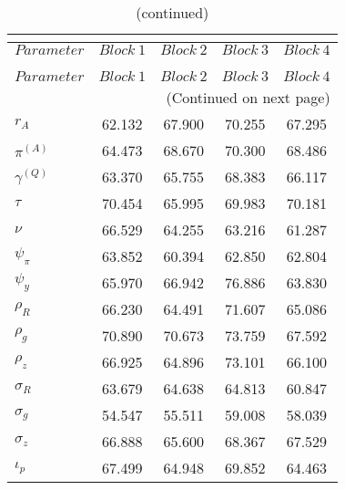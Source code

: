  
\begin{center}
\begin{longtable}{lcccc} 
\caption{MCMC Inefficiency factors per block}\\
 \label{Table:MCMC_inefficiency_factors}\\
\toprule 
$Parameter         $	 & 	 $     Block~1$	 & 	 $     Block~2$	 & 	 $     Block~3$	 & 	 $     Block~4$\\
\midrule \endfirsthead 
\caption{(continued)}\\
 \toprule \\ 
$Parameter         $	 & 	 $     Block~1$	 & 	 $     Block~2$	 & 	 $     Block~3$	 & 	 $     Block~4$\\
\midrule \endhead 
\midrule \multicolumn{5}{r}{(Continued on next page)} \\ \bottomrule \endfoot 
\bottomrule \endlastfoot 
$ {r_{A}}          $	 & 	      62.132	 & 	      67.900	 & 	      70.255	 & 	      67.295 \\ 
$ {\pi^{(A)}}      $	 & 	      64.473	 & 	      68.670	 & 	      70.300	 & 	      68.486 \\ 
$ {\gamma^{(Q)}}   $	 & 	      63.370	 & 	      65.755	 & 	      68.383	 & 	      66.117 \\ 
$ {\tau}           $	 & 	      70.454	 & 	      65.995	 & 	      69.983	 & 	      70.181 \\ 
$ {\nu}            $	 & 	      66.529	 & 	      64.255	 & 	      63.216	 & 	      61.287 \\ 
$ {\psi_\pi}       $	 & 	      63.852	 & 	      60.394	 & 	      62.850	 & 	      62.804 \\ 
$ {\psi_y}         $	 & 	      65.970	 & 	      66.942	 & 	      76.886	 & 	      63.830 \\ 
$ {\rho_R}         $	 & 	      66.230	 & 	      64.491	 & 	      71.607	 & 	      65.086 \\ 
$ {\rho_{g}}       $	 & 	      70.890	 & 	      70.673	 & 	      73.759	 & 	      67.592 \\ 
$ {\rho_z}         $	 & 	      66.925	 & 	      64.896	 & 	      73.101	 & 	      66.100 \\ 
$ {\sigma_R}       $	 & 	      63.679	 & 	      64.638	 & 	      64.813	 & 	      60.847 \\ 
$ {\sigma_{g}}     $	 & 	      54.547	 & 	      55.511	 & 	      59.008	 & 	      58.039 \\ 
$ {\sigma_z}       $	 & 	      66.888	 & 	      65.600	 & 	      68.367	 & 	      67.529 \\ 
$ {\iota_p}        $	 & 	      67.499	 & 	      64.948	 & 	      69.852	 & 	      64.463 \\ 
\end{longtable}
 \end{center}
